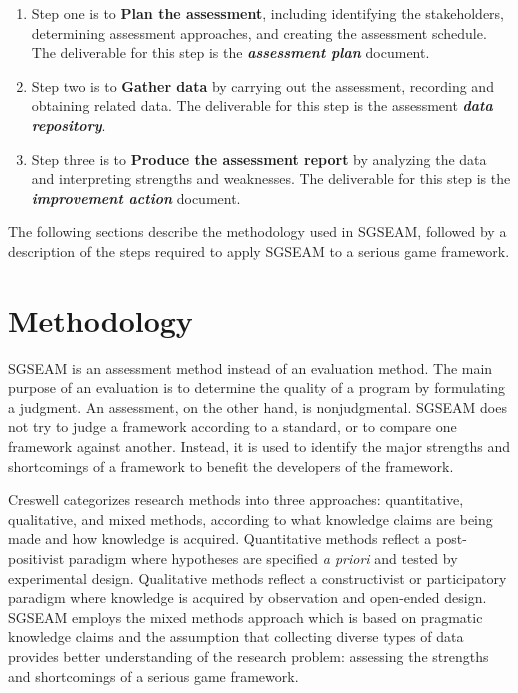 \begin{enumerate}
\item Step one is to {\bf Plan the assessment}, including
 identifying the stakeholders, determining assessment approaches, and creating the assessment schedule. 
 The deliverable for this step is the \textbf{\textit{assessment
     plan}} document. 

\item Step two is to {\bf Gather data} by carrying out 
 the assessment, recording and obtaining related data. The deliverable for this step is the 
 assessment \textbf{\textit{data repository}}. 

\item Step three is to {\bf Produce the assessment report} by analyzing 
 the data and interpreting strengths and weaknesses. The deliverable
 for this step is the \textbf{\textit{improvement action}} document.

\end{enumerate}
 
The following sections describe the methodology used in SGSEAM, followed by a
description of the steps required to apply SGSEAM to a serious game framework.

\section{Methodology}

SGSEAM is an assessment method instead of an evaluation method. The main purpose 
of an evaluation is to determine the quality of a program by formulating a judgment. An assessment, on 
the other hand, is nonjudgmental. SGSEAM does not try to judge a framework according to a 
standard, or to compare one framework against another. Instead, it is used to identify the major 
strengths and shortcomings of a framework to benefit  the developers of the framework.

Creswell \cite{creswell2003} categorizes research methods into three approaches:
quantitative, qualitative, and mixed methods, according to what knowledge claims are being made
and how knowledge is acquired. Quantitative methods reflect a post-positivist paradigm where
hypotheses are specified {\em a priori} and tested by experimental design. Qualitative methods
reflect a constructivist or participatory paradigm where knowledge is acquired by
observation and open-ended design. SGSEAM employs the mixed methods approach which is based on
pragmatic knowledge claims and the assumption that collecting diverse types of data provides better
understanding of the research problem: assessing the strengths and shortcomings of a serious game
framework.

